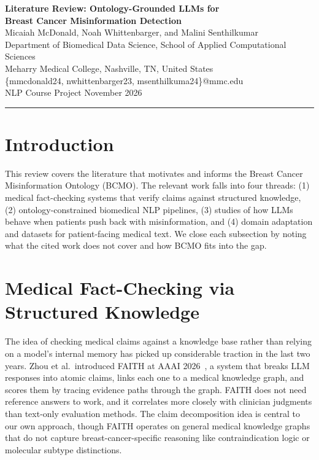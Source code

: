 \documentclass[11pt,a4paper]{article}
\begin{document}
\begin{center}
    {\Large\bfseries Literature Review: Ontology-Grounded LLMs for \\[2pt] Breast Cancer Misinformation Detection}\\[8pt]
    {\normalsize
        Micaiah McDonald,
        Noah Whittenbarger,
        and Malini Senthilkumar}\\[3pt]
    {\small Department of Biomedical Data Science, School of Applied Computational Sciences\\
    Meharry Medical College, Nashville, TN, United States}\\[2pt]
    {\small \{mmcdonald24, nwhittenbarger23, msenthilkuma24\}@mmc.edu}\\[6pt]
    {\normalsize NLP Course Project \hfill November 2026}
\end{center}
\vspace{4pt}
\hrule
\vspace{8pt}

\section{Introduction}

This review covers the literature that motivates and informs the Breast Cancer Misinformation Ontology (BCMO). The relevant work falls into four threads: (1) medical fact-checking systems that verify claims against structured knowledge, (2) ontology-constrained biomedical NLP pipelines, (3) studies of how LLMs behave when patients push back with misinformation, and (4) domain adaptation and datasets for patient-facing medical text. We close each subsection by noting what the cited work does not cover and how BCMO fits into the gap.

\section{Medical Fact-Checking via Structured Knowledge}

The idea of checking medical claims against a knowledge base rather than relying on a model's internal memory has picked up considerable traction in the last two years. Zhou et al.\ introduced FAITH at AAAI 2026~\cite{zhou2026faith}, a system that breaks LLM responses into atomic claims, links each one to a medical knowledge graph, and scores them by tracing evidence paths through the graph. FAITH does not need reference answers to work, and it correlates more closely with clinician judgments than text-only evaluation methods. The claim decomposition idea is central to our own approach, though FAITH operates on general medical knowledge graphs that do not capture breast-cancer-specific reasoning like contraindication logic or molecular subtype distinctions.
\end{document}
